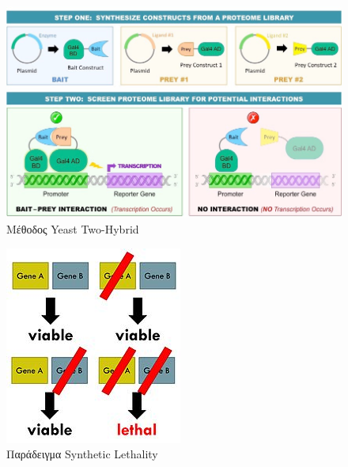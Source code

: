 \begin{figure}[h]
  \centering
  \includegraphics[scale=0.4]{images/yeast-2-hybrid_med.jpeg}
  \caption{Μέθοδος Yeast Two-Hybrid}
  \label{fig:yeast-2-hybrid_med}
\end{figure}

\begin{figure}[h]
  \centering
  \includegraphics[scale=0.75]{images/Synthetic_lethality.jpg}
  \caption{Παράδειγμα Synthetic Lethality}
  \label{fig:Synthetic_lethality}
\end{figure}

